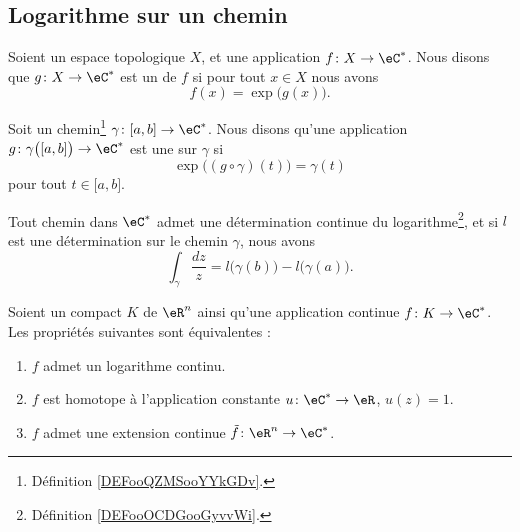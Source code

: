 \subsection{Logarithme sur un chemin}

\begin{definition}
    Soient un espace topologique \( X\), et une application \( f\colon X\to \eC^*\). Nous disons que \( g\colon X\to \eC^*\) est un  de \( f\) si pour tout \( x\in X\) nous avons
    \begin{equation}
        f(x)=\exp\big( g(x) \big).
    \end{equation}
\end{definition}

\begin{definition}     \label{DEFooOCDGooGyvvWi}
    Soit un chemin\footnote{Définition \ref{DEFooQZMSooYYkGDv}.} \( \gamma\colon \mathopen[ a , b \mathclose]\to \eC^*\). Nous disons qu'une application \( g\colon \gamma\big( \mathopen[ a , b \mathclose] \big)\to \eC^*\) est une  sur \( \gamma\) si
    \begin{equation}
        \exp\big( (g\circ\gamma)(t) \big)=\gamma(t)
    \end{equation}
    pour tout \( t\in \mathopen[ a , b \mathclose]\).
\end{definition}

\begin{theorem}     \label{THOooUPANooMiECqe}
    Tout chemin dans \( \eC^*\) admet une détermination continue du logarithme\footnote{Définition \ref{DEFooOCDGooGyvvWi}.}, et si \( l\) est une détermination sur le chemin \( \gamma\), nous avons
    \begin{equation}
        \int_{\gamma}\frac{ dz }{ z }=l\big( \gamma(b) \big)-l\big( \gamma(a) \big).
    \end{equation}
\end{theorem}

\begin{theorem}     \label{THOooTCUMooEByCKg}
    Soient un compact \( K\) de \( \eR^n\) ainsi qu'une application continue \( f\colon K\to \eC^*\). Les propriétés suivantes sont équivalentes :
    \begin{enumerate}
        \item   \label{ITEMooKZYDooKoEEbl}
            \( f\) admet un logarithme continu.
        \item   \label{ITEMooXVNXooVAHklr}
            \( f\) est homotope à l'application constante \( u\colon \eC^*\to \eR\), \( u(z)=1\).
        \item   \label{ITEMooQDHXooObjxLA}
            \( f\) admet une extension continue \( \tilde f\colon \eR^n\to \eC^*\).
    \end{enumerate}
\end{theorem}

